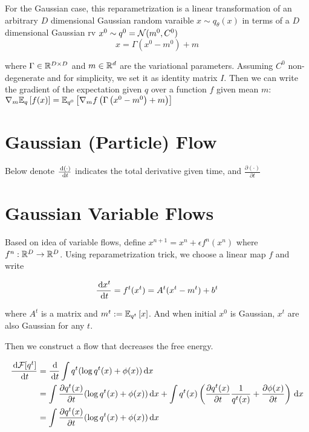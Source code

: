 \documentclass{article}
\begin{document}
For the Gaussian case, this reparametrization is a linear transformation of an arbitrary \(D\) dimensional Gaussian random varaible \(x\sim q_\theta (x)\) in terms of a \(D\) dimensional Gaussian rv \(x^0\sim q^0=\mathcal{N}(m^0,C^0)\)
\begin{equation}
    x = \Gamma(x^0-m^0)+m
\end{equation}

where \(\Gamma\in\mathbb{R}^{D\times D}\) and \(m\in \mathbb{R}^d\) are the variational parameters. Assuming \(C^0\) non-degenerate and for simplicity, we set it as identity matrix \(I\). Then we can write the gradient of the expectation given \(q\) over a function \(f\) given mean \(m\): \(\nabla_m\mathbb{E}_q\left[ f(x) \right] = \mathbb{E}_{q^0}\left[ \nabla_m f\left( \Gamma\left( x^0-m^0 \right)+m \right) \right]\)

\section{Gaussian (Particle) Flow}
Below denote \(\frac{\,\mathrm{d} (\cdot)}{\,\mathrm{d} t}\) indicates the total derivative given time, and \(\frac{\partial (\cdot)}{\partial t}\)

\section{Gaussian Variable Flows}
Based on idea of variable flows, define \(x^{n+1}=x^n+\epsilon f^n(x^n)\) where \(f^n:\mathbb{R}^D\to\mathbb{R}^D\). Using reparametrization trick, we choose a linear map \(f\) and write

\begin{equation}
    \frac{\,\mathrm{d} x^t}{\,\mathrm{d} t} = f^t(x^t)=A^t(x^t-m^t)+b^t
\end{equation}

where \(A^t\) is a matrix and \(m^t:=\mathbb{E}_{q^t}\left[ x \right]\). And when initial \(x^0\) is Gaussian, \(x^t\) are also Gaussian for any \(t\). 

Then we construct a flow that decreases the free energy.

\begin{align}
    \frac{\,\mathrm{d} \mathcal{F}[q^t]}{\,\mathrm{d} t}&=\frac{\,\mathrm{d}}{\,\mathrm{d} t} \int q^t (\log q^t(x)+\phi(x))\,\mathrm{d} x\\
    &= \int \frac{\partial q^t(x)}{\partial t}(\log q^t (x)+\phi(x))\,\mathrm{d} x+\int q^t(x)\left( \frac{\partial q^t(x)}{\partial t}\frac{1}{q^t(x)}+\frac{\partial \phi(x)}{\partial t} \right)\,\mathrm{d} x\\
    &= \int \frac{\partial q^t(x)}{\partial t} (\log q^t(x)+\phi(x)) \,\mathrm{d} x
\end{align}
\end{document}
